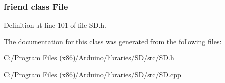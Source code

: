 \subsubsection[{File}]{\setlength{\rightskip}{0pt plus 5cm}friend class {\bf File}\hspace{0.3cm}{\ttfamily [friend]}}\label{class_s_d_class_a68d15876ad188b7628261b12d0eac8aa}


Definition at line 101 of file S\+D.\+h.



The documentation for this class was generated from the following files\+:\begin{DoxyCompactItemize}
\item 
C\+:/\+Program Files (x86)/\+Arduino/libraries/\+S\+D/src/\hyperlink{_s_d_8h}{S\+D.\+h}\item 
C\+:/\+Program Files (x86)/\+Arduino/libraries/\+S\+D/src/\hyperlink{_s_d_8cpp}{S\+D.\+cpp}\end{DoxyCompactItemize}
